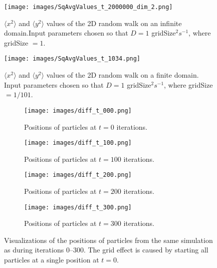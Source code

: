 \begin{figure}
    \centering
        \centering
        \texttt{[image: images/SqAvgValues\_t\_2000000\_dim\_2.png]}
        \caption{$\langle x^2\rangle$ and $\langle y^2\rangle$ values of the 2D random walk on an infinite domain.Input parameters chosen so that $D=1$ gridSize$^2s^{-1}$, where gridSize $=1$.}
        \label{fig:infinite-sqavg_2d_random_walk}
\end{figure}

\begin{figure}
        \centering
        \texttt{[image: images/SqAvgValues\_t\_1034.png]}
        \label{subfig:finite}
    \caption{$\langle x^2\rangle$ and $\langle y^2\rangle$ values of the 2D random walk on a finite domain. Input parameters chosen so that $D=1$ gridSize$^2s^{-1}$, where gridSize $=1/101$.}
    \label{fig:finite-sqavg_2d_random_walk}
\end{figure}

\begin{figure}
    \centering
    \begin{subfigure}[t]{0.45\textwidth}
        \centering
        \texttt{[image: images/diff\_t\_000.png]}
        \caption{Positions of particles at $t = 0$ iterations.}
        \label{subfig:diff_000}
    \end{subfigure}
    \hfill
    \begin{subfigure}[t]{0.45\textwidth}
        \centering
        \texttt{[image: images/diff\_t\_100.png]}
        \caption{Positions of particles at $t = 100$ iterations.}
        \label{subfig:diff_100}
    \end{subfigure}
    \medskip
    \begin{subfigure}[t]{0.45\textwidth}
        \centering
        \texttt{[image: images/diff\_t\_200.png]}
        \caption{Positions of particles at $t = 200$ iterations.}
        \label{subfig:diff_200}
    \end{subfigure}
    \hfill
    \begin{subfigure}[t]{0.45\textwidth}
        \centering
        \texttt{[image: images/diff\_t\_300.png]}
        \caption{Positions of particles at $t = 300$ iterations.}
        \label{subfig:diff_300}
    \end{subfigure}
    \caption{Visualizations of the positions of particles from the same simulation as  during iterations 0--300. The grid effect is caused by starting all particles at a single position at $t=0$.
    }
    \label{fig:diff_bounded}
\end{figure}


